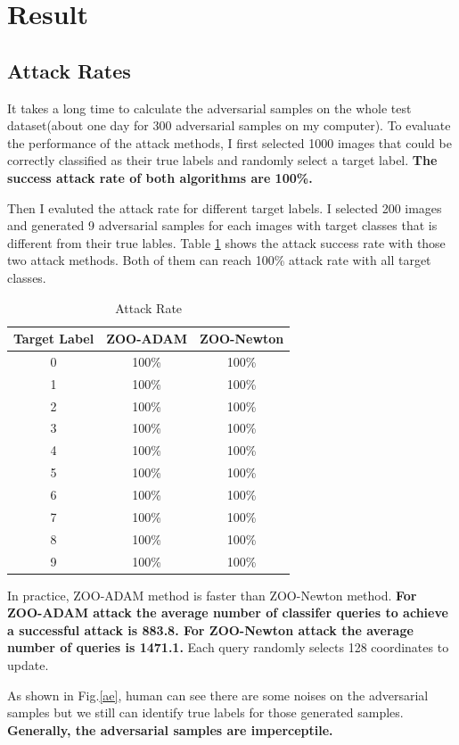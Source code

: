 \documentclass[a4paper]{article}
\begin{document}
\section{Result}


\subsection{Attack Rates}
It takes a long time to calculate the adversarial samples on the whole test dataset(about one day for 300 adversarial samples on my computer). To evaluate the performance of the attack methods, I first selected 1000 images that could be correctly classified as their true labels and randomly select a target label. \textbf{The success attack rate of both algorithms are 100\%. }

Then I evaluted the attack rate for different target labels.
I selected 200 images and  generated 9 adversarial samples for each images with target classes that is different from their true lables. Table \ref{ar} shows the attack success rate with those two attack methods. Both of them can reach 100\% attack rate with all target classes. 

\begin{table}[h]
\centering
\begin{tabular}{ccc}
\hline
Target Label&ZOO-ADAM&ZOO-Newton\\
\hline
0& 100\%&100\%\\
1& 100\%&100\%\\
2& 100\%&100\%\\
3& 100\%&100\%\\
4& 100\%&100\%\\
5& 100\%&100\%\\
6& 100\%&100\%\\
7& 100\%&100\%\\
8& 100\%&100\%\\
9& 100\%&100\%\\
\hline
\end{tabular}
\label{ar}
\caption{Attack Rate}
\end{table}
In practice, ZOO-ADAM method is faster than ZOO-Newton method.
\textbf{For ZOO-ADAM attack the average number of classifer queries to achieve a successful attack is 883.8.
For ZOO-Newton attack the average number of queries is 1471.1. }Each query randomly selects 128 coordinates to update.


As shown in Fig.\ref{ae}, human can see there are some noises on the adversarial samples but we still can identify true labels for those generated samples. \textbf{Generally, the adversarial samples are imperceptile.}
\end{document}

